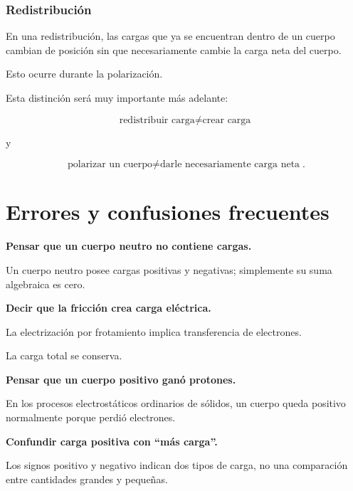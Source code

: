 \subsubsection{Redistribución}

En una redistribución, las cargas que ya se encuentran dentro de un cuerpo
cambian de posición sin que necesariamente cambie la carga neta del cuerpo.

Esto ocurre durante la polarización.

\begin{idea}
Esta distinción será muy importante más adelante:

\[
\boxed{
\text{redistribuir carga}
\neq
\text{crear carga}
}
\]

y

\[
\boxed{
\text{polarizar un cuerpo}
\neq
\text{darle necesariamente carga neta}
}.
\]
\end{idea}



\section{Errores y confusiones frecuentes}

\begin{errorfrecuente}
\textbf{Pensar que un cuerpo neutro no contiene cargas.}

Un cuerpo neutro posee cargas positivas y negativas; simplemente su suma
algebraica es cero.
\end{errorfrecuente}


\begin{errorfrecuente}
\textbf{Decir que la fricción crea carga eléctrica.}

La electrización por frotamiento implica transferencia de electrones.

La carga total se conserva.
\end{errorfrecuente}


\begin{errorfrecuente}
\textbf{Pensar que un cuerpo positivo ganó protones.}

En los procesos electrostáticos ordinarios de sólidos, un cuerpo queda
positivo normalmente porque perdió electrones.
\end{errorfrecuente}


\begin{errorfrecuente}
\textbf{Confundir carga positiva con ``más carga''.}

Los signos positivo y negativo indican dos tipos de carga, no una comparación
entre cantidades grandes y pequeñas.
\end{errorfrecuente}


